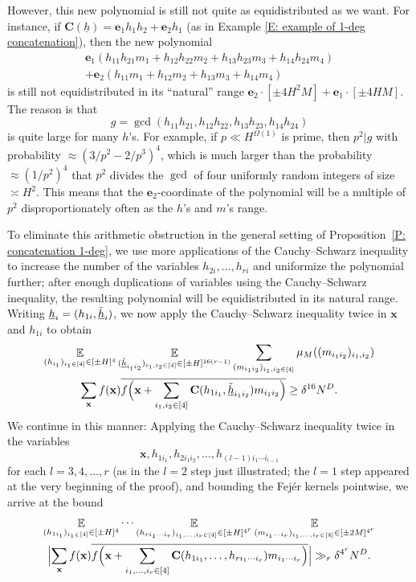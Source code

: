 \documentclass[11pt]{amsart}
\theoremstyle{definition}
\DeclareMathOperator*{\E}{\mathbb{E}}
\newcommand{\bc}{{\textbf{C}}}
\newcommand{\be}{{\mathbf{e}}}
\newcommand{\bx}{{\textbf{x}}}
\newcommand{\uh}{{\underline{h}}}
\newcommand{\Bigabs}[1]{\Bigl| #1 \Bigr|}
\newcommand{\Bigbrac}[1]{\Bigl( #1 \Bigr)}
\begin{document}
However, this new polynomial is still not quite as equidistributed as we want.  For instance, if $\bc(\uh) = \be_1  h_1 h_2+\be_2 h_1$ (as in Example \ref{E: example of 1-deg concatenation}), then the new polynomial
\begin{gather*}
   \be_1 (h_{11} h_{21} m_{1} + h_{12}h_{22}m_{2} + h_{13}h_{23}m_{3}+h_{14}h_{24}m_{4})\\
   + \be_2(h_{11} m_{1} + h_{12}m_{2} + h_{13}m_{3}+h_{14}m_{4})
\end{gather*}
is still not equidistributed in its ``natural'' range $ \be_2\cdot[\pm 4 H^2 M]+\be_1\cdot[\pm 4 H M]$. The reason is that $$g =\gcd(h_{11}h_{21}, h_{12}h_{22},h_{13}h_{23},h_{14}h_{24})$$ is quite large for many $h$'s.  For example, if $p\ll H^{\Omega(1)}$ is prime, then $p^2| g$ with probability $\approx (3/p^2-2/p^3)^4$, which is much larger than the probability $\approx(1/p^2)^4$ that $p^2$ divides the $\gcd$ of four uniformly random integers of size $\asymp H^2$. {This means that the $\be_2$-coordinate of the polynomial will be a multiple of $p^2$ disproportionately often as the $h$'s and $m$'s range.}

To eliminate this arithmetic obstruction in the general setting of Proposition~\ref{P: concatenation 1-deg}, we use more applications of the Cauchy--Schwarz inequality to increase the number of the variables $h_{2i}, \ldots, h_{ri}$ and uniformize the polynomial further; after enough duplications of variables using the Cauchy--Schwarz inequality, the resulting polynomial will be equidistributed in its natural range.
Writing $\uh_{i} = (h_{1i}, \Tilde{\uh}_{i})$, we now apply the Cauchy--Schwarz
inequality twice in $\bx$ and $h_{1i}$
to obtain
\begin{multline*}
    \E_{(h_{i_1})_{i_1\in [4]}\in[\pm H]^4}    \E_{(\tilde{\uh}_{i_1i_2})_{i_1,i_2\in [4]}\in[\pm H]^{16(r-1)}}
    \sum_{(m_{i_1i_2})_{i_1,i_2\in[4]}} \mu_M((m_{i_1i_2})_{i_1,i_2}) \\ \sum_\bx f(\bx)\overline{f\Bigbrac{\bx+\sum_{\substack{i_1,i_2\in[4]}}
    \bc(h_{1i_1}, \tilde{\uh}_{i_1i_2} )m_{i_1i_2}}}\geq \delta^{16} N^D.
\end{multline*}
We continue in this manner: Applying the Cauchy--Schwarz inequality twice in the variables $$\bx, h_{1i_1}, h_{2i_1 i_2}, \ldots, h_{(l-1)i_1\cdots i_{l-1}}$$ for each $l=3,4, \ldots, r$ (as in the $l=2$ step just illustrated; the $l=1$ step appeared at the very beginning of the proof), and bounding the Fej\'er kernels pointwise, we arrive at the bound
\begin{multline*}
    \E_{(h_{1i_1})_{i_1\in [4]}\in[\pm H]^4}
    \cdots \E_{(h_{ri_1\cdots i_r})_{i_1, \ldots,  i_r\in [4]}\in[\pm H]^{4^r}}\E_{(m_{i_1\cdots  i_r})_{i_1, \ldots, i_r\in[4]}\in[\pm 2M]^{4^r}}\\
    \Bigabs{\sum_\bx f(\bx)\overline{f\Bigbrac{\bx+\sum_{\substack{i_1,\ldots, i_r\in[4]}}\bc(h_{1i_1}, \ldots, h_{ri_1\cdots  i_r})m_{i_1\cdots  i_r}}}}\gg_r \delta^{4^r} N^D.
\end{multline*}
\end{document}
